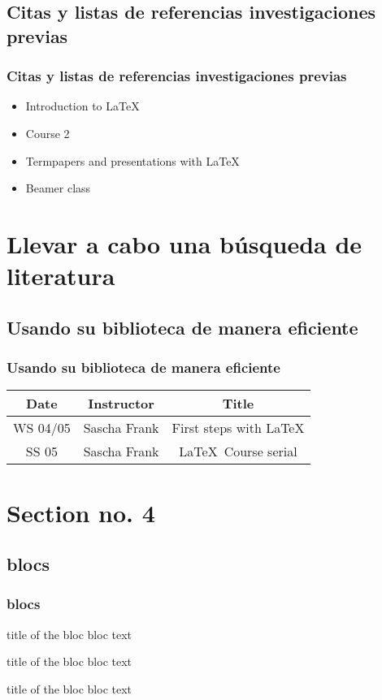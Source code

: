 \documentclass{beamer}
\begin{document}
\subsection{ Citas y listas de referencias investigaciones previas}
\begin{frame}\frametitle{Citas y listas de referencias investigaciones previas}
\begin{itemize}
\item Introduction to  \LaTeX  
\item Course 2 
\item Termpapers and presentations with \LaTeX 
\item Beamer class
\end{itemize} 
\end{frame}

\section{Llevar a cabo una búsqueda de literatura} 
\subsection{Usando su biblioteca de manera eficiente}
\begin{frame}\frametitle{Usando su biblioteca de manera eficiente}
\begin{tabular}{|c|c|c|}
\hline
\textbf{Date} & \textbf{Instructor} & \textbf{Title} \\
\hline
WS 04/05 & Sascha Frank & First steps with  \LaTeX  \\
\hline
SS 05 & Sascha Frank & \LaTeX \ Course serial \\
\hline
\end{tabular}
\end{frame}

\section{Section no. 4}
\subsection{blocs}
\begin{frame}\frametitle{blocs}

\begin{block}{title of the bloc}
bloc text
\end{block}

\begin{exampleblock}{title of the bloc}
bloc text
\end{exampleblock}


\begin{alertblock}{title of the bloc}
bloc text
\end{alertblock}
\end{frame}
\end{document}
